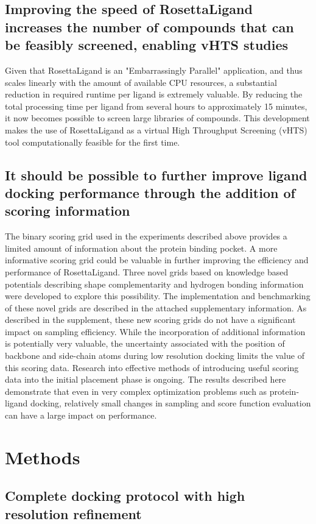 \subsection{Improving the speed of RosettaLigand increases the number of compounds that can be feasibly screened, enabling vHTS studies}
Given that RosettaLigand is an "Embarrassingly Parallel" application, and thus scales linearly with the amount of available CPU resources, a substantial reduction in required runtime per ligand is extremely valuable.
By reducing the total processing time per ligand from several hours to approximately 15 minutes, it now becomes possible to screen large libraries of compounds.
This development makes the use of RosettaLigand as a virtual High Throughput Screening (vHTS) tool computationally feasible for the first time.

\subsection{It should be possible to further improve ligand docking performance through the addition of scoring information}
The binary scoring grid used in the experiments described above provides a limited amount of information about the protein binding pocket.
A more informative scoring grid could be valuable in further improving the efficiency and performance of RosettaLigand.
Three novel grids based on knowledge based potentials describing shape complementarity and hydrogen bonding information were developed to explore this possibility.
The implementation and benchmarking of these novel grids are described in the attached supplementary information. 
As described in the supplement, these new scoring grids do not have a significant impact on sampling efficiency.
While the incorporation of additional information is potentially very valuable, the uncertainty associated with the position of backbone and side-chain atoms during low resolution docking limits the value of this scoring data.
Research into effective methods of introducing useful scoring data into the initial placement phase is ongoing.
The results described here demonstrate that even in very complex optimization problems such as protein-ligand docking, relatively small changes in sampling and score function evaluation can have a  large impact on performance. 

\section{Methods}
\subsection{Complete docking protocol with high resolution refinement}
